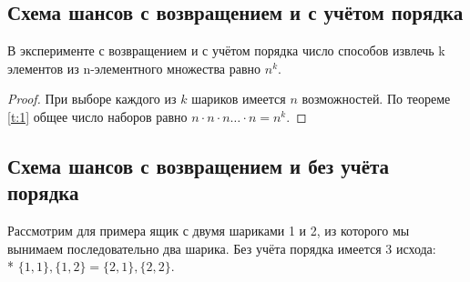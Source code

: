 \subsection{Схема шансов с возвращением и с учётом порядка}
\begin{theorem}
В эксперименте с возвращением и с учётом порядка число
способов извлечь k элементов из n-элементного множества равно $n^k$.
\end{theorem}
\begin{proof}
При выборе каждого из $k$ шариков имеется $n$ возможностей. 
По теореме \ref{t:1} общее число наборов равно $n\cdot n\cdot n\dots\cdot n=n^k$.
\end{proof}
\subsection{Схема шансов с возвращением и без учёта порядка}
\begin{remark}
\label{remark:1}
Рассмотрим для примера ящик с двумя шариками 1 и 2,
из которого мы вынимаем последовательно два шарика. Без учёта порядка
имеется 3 исхода: 
\\* $\{1,1\}, \{1,2\} = \{2,1\}, \{2, 2\}$.
\end{remark}

